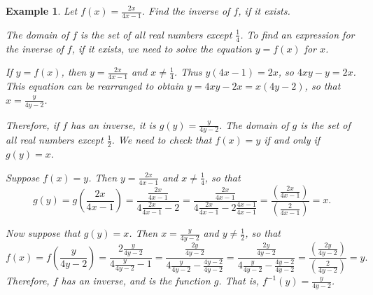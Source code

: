 \documentclass[11pt]{book}               %
\newtheorem{example}{Example}
\begin{document}
\begin{example}
Let $f(x) = \frac{2x}{4x-1}$.  Find the inverse of $f$, if it exists.

\normalfont
The domain of $f$ is the set of all real numbers except $\frac{1}{4}$.  To find an expression for the inverse of $f$, if it exists, we need to solve the equation $y = f(x)$ for $x$.

If $y = f(x)$, then $y = \frac{2x}{4x-1}$ and $x \neq \frac{1}{4}$.
Thus $y(4x-1) = 2x$, so $4xy - y = 2x$.
This equation can be rearranged to obtain $y = 4xy - 2x = x(4y-2)$, so that $x = \frac{y}{4y-2}$.

Therefore, if $f$ has an inverse, it is $g(y) =  \frac{y}{4y-2}$.
The domain of $g$ is the set of all real numbers except $\frac{1}{2}$.
We need to check that $f(x) = y$ if and only if $g(y) = x$.

Suppose $f(x) = y$.  Then $y = \frac{2x}{4x-1}$ and $x \neq \frac{1}{4}$, so that 
$$g(y) = g\left(\frac{2x}{4x-1}\right) = \frac{\frac{2x}{4x-1}}{4\frac{2x}{4x-1} - 2}
=  \frac{\frac{2x}{4x-1}}{4\frac{2x}{4x-1} - 2\frac{4x-1}{4x-1}} 
= \frac{ \left(\frac{2x}{4x-1}\right) }{ \left(\frac{2}{4x-1}\right)}  = x.
$$

Now suppose that $g(y) = x$.
Then $x = \frac{y}{4y-2}$ and $y \neq \frac{1}{2}$, so that
$$
f(x) = f\left(\frac{y}{4y-2}\right) = \frac{ 2\frac{y}{4y-2} } { 4 \frac{y}{4y-2} - 1 }
= \frac{ \frac{2y}{4y-2} } { 4 \frac{y}{4y-2} - \frac{4y-2}{4y-2} }
= \frac{ \frac{2y}{4y-2} } { 4 \frac{y}{4y-2} - \frac{4y-2}{4y-2} }
= \frac{ \left( \frac{2y}{4y-2} \right) } {\left( \frac{2}{4y-2} \right)} = y.
$$
Therefore, $f$ has an inverse, and is the function $g$.
That is, $f^{-1}(y) = \frac{y}{4y-2}$.
\end{example}


\end{document}
